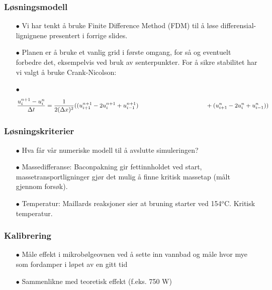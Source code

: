 \documentclass[screen]{beamer}
\begin{document}
\begin{frame}
  \frametitle{Løsningsmodell}
  \begin{itemize}
    \item[$\bullet$] Vi har tenkt å bruke Finite Difference Method (FDM) til å løse differensial-
lignignene presentert i forrige slides.

\item[$\bullet$] Planen er å bruke et vanlig grid i første omgang, for så og eventuelt forbedre
det, eksempelvis ved bruk av senterpunkter. For å sikre stabilitet har vi valgt
å bruke Crank-Nicolson:

\item[$\bullet$] 
\begin{equation*}
  \frac{u_i^{n+1}-u_i^n}{\Delta t} = \frac{1}{2(\Delta x)^2}((
  u_{i+1}^{n+1}-2u_i^{n+1}+u_{i-1}^{n+1}) \\ \hspace{110pt} + (u_{i+1}^{n} - 2u_i^n +
  u_{i-1}^{n}) ) 
\end{equation*}
  \end{itemize}
\end{frame}

\begin{frame}
  \frametitle{Løsningskriterier}
  \begin{center}
  \begin{itemize}  
    \item[$\bullet$] Hva får vår numeriske modell
      til å avslutte simuleringen?

\item[$\bullet$] Massedifferanse: Baconpakning gir fettinnholdet ved start,
  massetransportligninger gjør det mulig å finne kritisk massetap (målt gjennom forsøk).

\item[$\bullet$] Temperatur: Maillards reaksjoner sier at bruning starter ved
  154$^o$C. Kritisk temperatur.
  \end{itemize}
  \end{center}
\end{frame}

\begin{frame}
  \frametitle{Kalibrering}
  \begin{itemize}
	\item[$\bullet$] Måle effekt i mikrobølgeovnen ved å sette inn vannbad og måle hvor mye
	som fordamper i løpet av en gitt tid
        \item[$\bullet$] Sammenlikne med teoretisk effekt (f.eks. 750 W)
  \end{itemize}
\end{frame}
\end{document}
